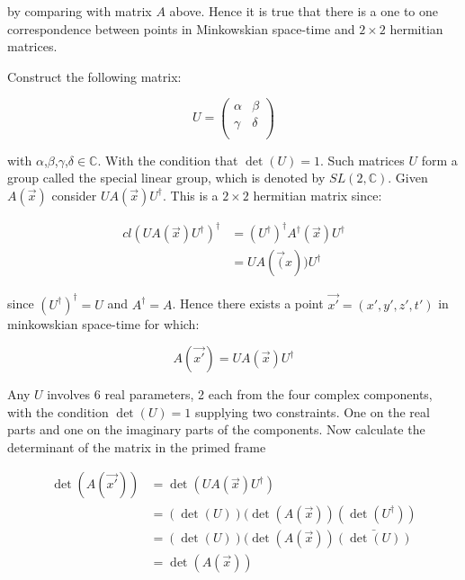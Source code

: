 \noindent by comparing with matrix $A$ above. Hence it is true that there is a one to one correspondence between points in Minkowskian space-time and $2 \times 2$ hermitian matrices.

Construct the following matrix:

\begin{equation*} 
U = \left( 
\begin{array}{cc}
\alpha & \beta \\
\gamma & \delta \\
\end{array}
\right)
\end{equation*}

\noindent with $\alpha$,$\beta$,$\gamma$,$\delta \in \mathbb{C}$. With the condition that $\det(U) = 1$. Such matrices $U$ form a group called the special linear group, which is denoted by $SL(2, \mathbb{C})$. Given $A(\vec{x})$ consider $U A(\vec{x}) U^{\dagger}$. This is a $2 \times 2$ hermitian matrix since:

\begin{eqnarray*} {cl}
(U A(\vec{x}) U^{\dagger})^{\dagger} & =  (U^{\dagger})^{\dagger} A^{\dagger}(\vec{x}) U^{\dagger} \\
                                     & = U A(\vec(x)) U^{\dagger}
\end{eqnarray*} 

\noindent since $(U^{\dagger})^{\dagger} = U$ and $A^{\dagger} = A$. Hence there exists a point $\vec{x'} = (x', y', z', t')$ in minkowskian space-time for which:

\begin{equation}\label{SL_trans}
A(\vec{x'}) = U A(\vec{x}) U^{\dagger}
\end{equation}

Any $U$ involves 6 real parameters, 2 each from the four complex components, with the condition $\det(U) = 1$ supplying two constraints. One on the real parts and one on the imaginary parts of the components. Now calculate the determinant of the matrix in the primed frame

\begin{eqnarray*}  
\det(A(\vec{x'})) & = \det(U A(\vec{x}) U^{\dagger}) \\
                  & = (\det(U))(\det(A(\vec{x}))(\det(U^{\dagger})) \\
                  & = (\det(U))(\det(A(\vec{x}))\bar{(\det(U))} \\
                  & = \det(A(\vec{x}))
\end{eqnarray*}

